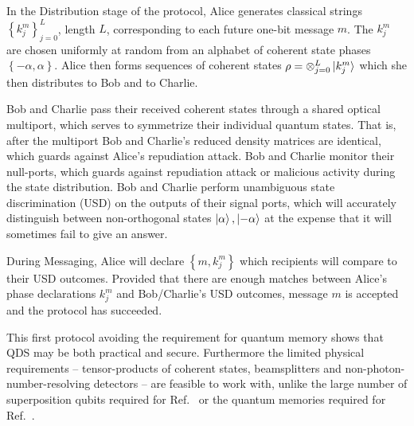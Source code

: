 In the Distribution stage of the protocol, Alice generates classical strings $\left\{k_j^m\right\}_{j=0}^L$, length $L$, corresponding to each future one-bit message $m$. The $k_j^m$ are chosen uniformly at random from an alphabet of coherent state phases $\left\{- \alpha, \alpha\right\}$. Alice then forms sequences of coherent states $\rho = \otimes_{j=0}^L \ket{k_j^m}$ which she then distributes to Bob and to Charlie. 

Bob and Charlie pass their received coherent states through a shared optical multiport, which serves to symmetrize their individual quantum states. That is, after the multiport Bob and Charlie's reduced density matrices are identical, which guards against Alice's repudiation attack. %
Bob and Charlie monitor their null-ports, which guards against repudiation attack or malicious activity during the state distribution. Bob and Charlie perform unambiguous state discrimination (USD) on the outputs of their signal ports, which will accurately distinguish between non-orthogonal states $\ket{\alpha}, \ket{-\alpha}$ at the expense that it will sometimes fail to give an answer.  

During Messaging, Alice will declare $\left\{m, k_j^m\right\}$ which recipients will compare to their USD outcomes. Provided that there are enough matches between Alice's phase declarations $k_j^m$ and Bob/Charlie's USD outcomes, message $m$ is accepted and the protocol has succeeded.

This first protocol avoiding the requirement for quantum memory shows that QDS may be both practical and secure. Furthermore the limited physical requirements -- tensor-products of coherent states, beamsplitters and non-photon-number-resolving detectors -- are feasible to work with, unlike the large number of superposition qubits required for Ref.~\cite{Gottesman2001} or the quantum memories required for Ref.~\cite{Andersson2006}.

